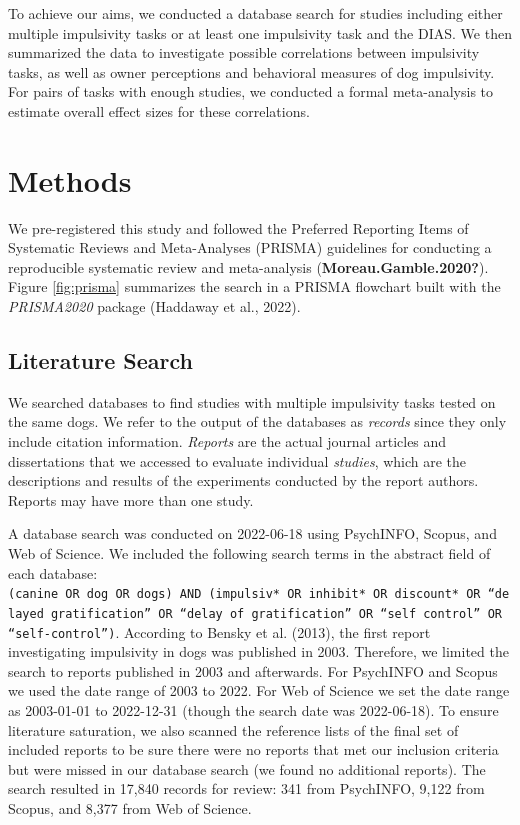 \documentclass[
  ,pub,floatsintext]{apa6}
\begin{document}

To achieve our aims, we conducted a database search for studies including either multiple impulsivity tasks or at least one impulsivity task and the DIAS. We then summarized the data to investigate possible correlations between impulsivity tasks, as well as owner perceptions and behavioral measures of dog impulsivity. For pairs of tasks with enough studies, we conducted a formal meta-analysis to estimate overall effect sizes for these correlations.

\hypertarget{methods}{%
\section{Methods}\label{methods}}

We pre-registered this study and followed the Preferred Reporting Items of Systematic Reviews and Meta-Analyses (PRISMA) guidelines for conducting a reproducible systematic review and meta-analysis (\textbf{Moreau.Gamble.2020?}). Figure \ref{fig:prisma} summarizes the search in a PRISMA flowchart built with the \emph{PRISMA2020} package (Haddaway et al., 2022).

\hypertarget{literature-search}{%
\subsection{Literature Search}\label{literature-search}}

We searched databases to find studies with multiple impulsivity tasks tested on the same dogs. We refer to the output of the databases as \emph{records} since they only include citation information. \emph{Reports} are the actual journal articles and dissertations that we accessed to evaluate individual \emph{studies}, which are the descriptions and results of the experiments conducted by the report authors. Reports may have more than one study.

A database search was conducted on 2022-06-18 using PsychINFO, Scopus, and Web of Science. We included the following search terms in the abstract field of each database: \texttt{(canine\ OR\ dog\ OR\ dogs)\ AND\ (impulsiv*\ OR\ inhibit*\ OR\ discount*\ OR\ “delayed\ gratification”\ OR\ “delay\ of\ gratification”\ OR\ “self\ control”\ OR\ “self-control”)}. According to Bensky et al. (2013), the first report investigating impulsivity in dogs was published in 2003. Therefore, we limited the search to reports published in 2003 and afterwards. For PsychINFO and Scopus we used the date range of 2003 to 2022. For Web of Science we set the date range as 2003-01-01 to 2022-12-31 (though the search date was 2022-06-18). To ensure literature saturation, we also scanned the reference lists of the final set of included reports to be sure there were no reports that met our inclusion criteria but were missed in our database search (we found no additional reports). The search resulted in 17,840 records for review: 341 from PsychINFO, 9,122 from Scopus, and 8,377 from Web of Science.
\end{document}
